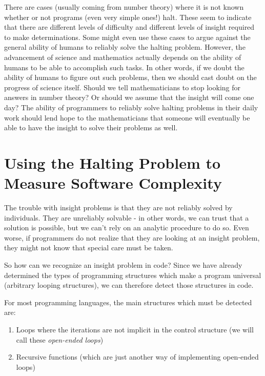 There are cases (usually coming from number theory) where it is not known whether or not programs (even very simple ones!)  halt.  These seem to indicate that there are different levels of difficulty and different levels of insight required to make determinations.  Some might even use these cases to argue against the general ability of humans to reliably solve the halting problem.  However, the advancement of science and mathematics actually depends on the ability of humans to be able to accomplish such tasks.  In other words, if we doubt the ability of humans to figure out such problems, then we should cast doubt on the progress of science itself.  Should we tell mathematicians to stop looking for answers in number theory?   Or should we assume that the insight will come one day?  The ability of programmers to reliably solve halting problems in their daily work should lend hope to the mathematicians that someone will eventually be able to have the insight to solve their problems as well.

\section[Using the Halting Problem]{Using the Halting Problem to Measure Software Complexity}

The trouble with insight problems is that they are not reliably solved by individuals.  They are unreliably solvable - in other words, we can trust that a solution is possible, but we can't rely on an analytic procedure to do so.  Even worse, if programmers do not realize that they are looking at an insight problem, they might not know that special care must be taken.

So how can we recognize an insight problem in code?  Since we have already determined the types of programming structures which make a program universal (arbitrary looping structures), we can therefore detect those structures in code.

For most programming languages, the main structures which must be detected are:

\begin{enumerate}
\item Loops where the iterations are not implicit in the control structure (we will call these \emph{open-ended loops})
\item Recursive functions (which are just another way of implementing open-ended loops)
\end{enumerate}

